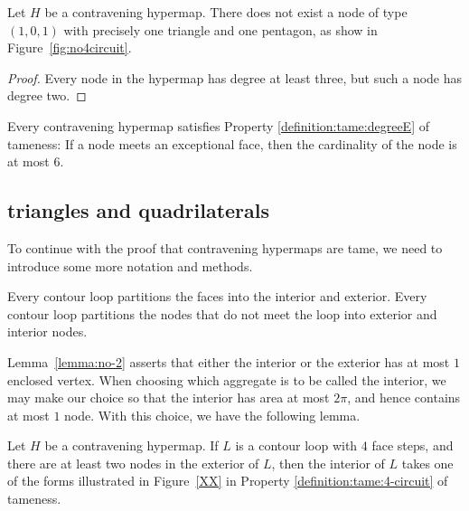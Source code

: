 \begin{lemma}\label{lemma:nobad4}
Let $H$ be a contravening hypermap.
There does not exist a node of 
type $(1,0,1)$ with precisely one triangle and
one pentagon, as show in Figure~\ref{fig:no4circuit}. 
\end{lemma}

\begin{proof}  Every node in
the hypermap has degree at least three, but such a node
has degree two.
\end{proof}

\begin{lemma} \label{lemma:deg5}
Every contravening hypermap satisfies Property
\ref{definition:tame:degreeE} of tameness: If a node meets an
exceptional face, then the cardinality of the node is at most $6$.
\end{lemma}

\subsection{triangles and quadrilaterals}


\label{sec:2.2}  To continue with the proof that
contravening hypermaps are tame, we need to introduce some more
notation and methods.



Every contour loop partitions the faces into the interior and
exterior.  Every contour loop partitions the nodes that do not meet
the loop into exterior and interior nodes.
%

Lemma~\ref{lemma:no-2} asserts that either the interior or the
exterior has at most $1$ enclosed vertex.   When choosing which
aggregate is to be called the interior, we may make our choice so
that the interior has area at most $2\pi$, and hence contains at
most $1$ node. With this choice, we have the following lemma.

\begin{lemma}
Let $H$ be a contravening hypermap. If
$L$ is a contour loop with $4$ face steps, and there are at least
two nodes in the exterior of $L$, then the interior of $L$ takes one
of the forms illustrated in Figure~\ref{XX} in Property
    \ref{definition:tame:4-circuit} of tameness.
\end{lemma}

